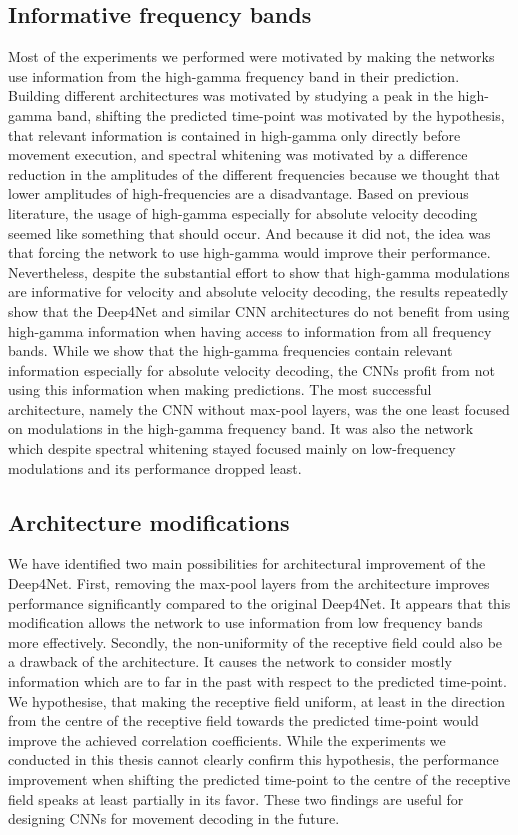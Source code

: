 \subsection*{Informative frequency bands}
Most of the experiments we performed were motivated by making the networks use information from the high-gamma frequency band in their prediction.
Building different architectures was motivated by studying a peak in the high-gamma band, shifting the predicted time-point was motivated by the hypothesis, that relevant information is contained in high-gamma only directly before movement execution, and spectral whitening was motivated by a difference reduction in the amplitudes of the different frequencies because we thought that lower amplitudes of high-frequencies are a disadvantage.
Based on previous literature, the usage of high-gamma especially for absolute velocity decoding seemed like something that should occur.
And because it did not, the idea was that forcing the network to use high-gamma would improve their performance.
Nevertheless, despite the substantial effort to show that high-gamma modulations are informative for velocity and absolute velocity decoding, the results repeatedly show that the Deep4Net and similar CNN architectures do not benefit from using high-gamma information when having access to information from all frequency bands.
While we show that the high-gamma frequencies contain relevant information especially for absolute velocity decoding, the CNNs profit from not using this information when making predictions.
The most successful architecture, namely the CNN without max-pool layers, was the one least focused on modulations in the high-gamma frequency band.
It was also the network which despite spectral whitening stayed focused mainly on low-frequency modulations and its performance dropped least. \\

\subsection*{Architecture modifications}
We have identified two main possibilities for architectural improvement of the Deep4Net. 
First, removing the max-pool layers from the architecture improves performance significantly compared to the original Deep4Net. 
It appears that this modification allows the network to use information from low frequency bands more effectively. 
Secondly, the non-uniformity of the receptive field could also be a drawback of the architecture.
It causes the network to consider mostly information which are to far in the past with respect to the predicted time-point.
We hypothesise, that making the receptive field uniform, at least in the direction from the centre of the receptive field towards the predicted time-point would improve the achieved correlation coefficients.
While the experiments we conducted in this thesis cannot clearly confirm this hypothesis, the performance improvement when shifting the predicted time-point to the centre of the receptive field speaks at least partially in its favor. 
These two findings are useful for designing CNNs for movement decoding in the future.

